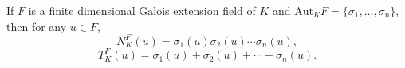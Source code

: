 If $F$ is a finite dimensional Galois extension field of $K$ and $\mathrm{Aut}_K F = \{\sigma_1, \ldots, \sigma_n\}$, then for any $u \in F$,
$$N_K^F(u) = \sigma_1(u)\sigma_2(u) \cdots \sigma_n(u),$$
$$T_K^F(u) = \sigma_1(u) + \sigma_2(u) + \cdots + \sigma_n(u).$$
